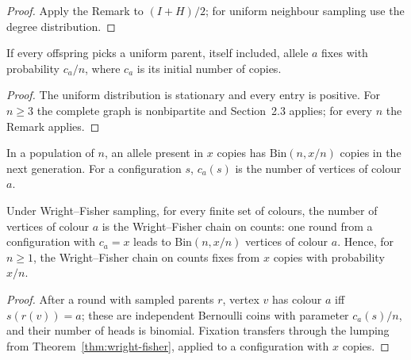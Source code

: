 \begin{proof}\leanok
Apply the Remark to $(I+H)/2$; for uniform neighbour sampling use the degree distribution.
\end{proof}
\begin{theorem}\label{thm:wright-fisher}
\leanok{}
If every offspring picks a uniform parent, itself included, allele $a$ fixes with probability
$c_a/n$, where $c_a$ is its initial number of copies.
\end{theorem}
\begin{proof}\leanok
The uniform distribution is stationary and every entry is positive. For $n\ge 3$ the
complete graph is nonbipartite and Section~2.3 applies; for every $n$ the Remark applies.
\end{proof}
\begin{definition}\label{def:wf-counts}
\leanok{}
In a population of $n$, an allele present in $x$ copies has $\mathrm{Bin}(n,x/n)$ copies in the
next generation. For a configuration $s$, $c_a(s)$ is the number of vertices of colour $a$.
\end{definition}
\begin{theorem}\label{thm:wf-counts}
\leanok{}
Under Wright--Fisher sampling, for every finite set of colours, the number of vertices of colour
$a$ is the Wright--Fisher chain on counts: one round from a configuration with $c_a=x$ leads to
$\mathrm{Bin}(n,x/n)$ vertices of colour $a$. Hence, for $n\ge1$, the Wright--Fisher chain on
counts fixes from $x$ copies with probability $x/n$.
\end{theorem}
\begin{proof}\leanok
After a round with sampled parents $r$, vertex $v$ has colour $a$ iff $s(r(v))=a$; these are
independent Bernoulli coins with parameter $c_a(s)/n$, and their number of heads is binomial.
Fixation transfers through the lumping from Theorem~\ref{thm:wright-fisher}, applied to a
configuration with $x$ copies.
\end{proof}

